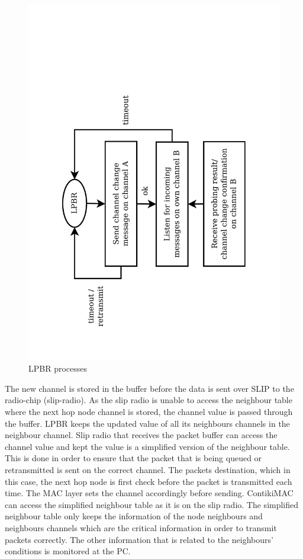 \begin{figure}
\centering
\includegraphics[trim=2cm 1cm 2cm 4cm, clip=true, totalheight=0.55\textheight, angle=270]{lpbrProcess.pdf}
\caption{LPBR processes}
\label{lpbrProcess}
\end{figure}

The new channel is stored in the buffer before the data is sent over SLIP to the radio-chip (slip-radio). As the slip radio is unable to access the neighbour table where the next hop node channel is stored, the channel value is passed through the buffer. LPBR keeps the updated value of all its neighbours channels in the neighbour channel. Slip radio that receives the packet buffer can access the channel value and kept the value is a simplified version of the neighbour table. This is done in order to ensure that the packet that is being queued or retransmitted is sent on the correct channel. The packets destination, which in this case, the next hop node is first check before the packet is transmitted each time. The MAC layer sets the channel accordingly before sending. ContikiMAC can access the simplified neighbour table as it is on the slip radio. The simplified neighbour table only keeps the information of the node neighbours and neighbours channels which are the critical information in order to transmit packets correctly. The other information that is related to the neighbours' conditions is monitored at the PC. 

